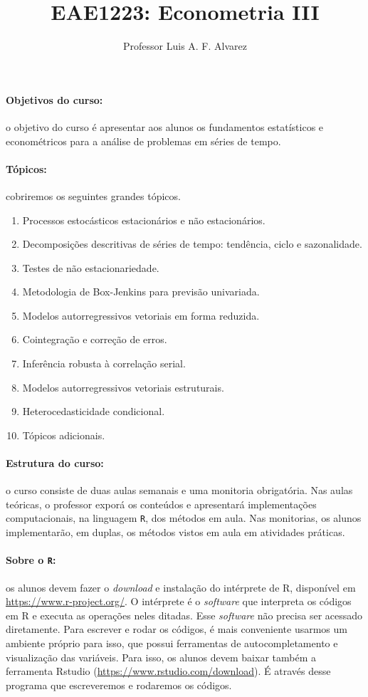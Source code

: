 \documentclass[10pt,a4paper]{article}
\title{\large EAE1223: Econometria III}
\author{Professor Luis A. F. Alvarez}
\date{}
\begin{document}
	\maketitle
	\paragraph{Objetivos do curso:} o objetivo do curso é apresentar aos alunos os fundamentos estatísticos e econométricos para a análise de problemas em séries de tempo.
	\paragraph{Tópicos:} cobriremos os seguintes grandes tópicos.
	\begin{enumerate}
		\item Processos estocásticos estacionários e não estacionários.
		\item Decomposições descritivas de séries de tempo: tendência, ciclo e sazonalidade.
		\item Testes de não estacionariedade.
		\item Metodologia de Box-Jenkins para previsão univariada.
		\item Modelos autorregressivos vetoriais em forma reduzida.
		\item Cointegração e correção de erros.
		\item Inferência robusta à correlação serial.
		\item Modelos autorregressivos vetoriais estruturais.
		\item Heterocedasticidade condicional.
		\item Tópicos adicionais.
	\end{enumerate} 
	\paragraph{Estrutura do curso:} o curso consiste de duas aulas semanais e uma monitoria obrigatória. Nas aulas teóricas, o professor exporá os conteúdos e apresentará implementações computacionais, na linguagem \texttt{R}, dos métodos em aula. Nas monitorias, os alunos implementarão, em duplas, os métodos vistos em aula em atividades práticas.
	
	\paragraph{Sobre o \texttt{R}:}  os alunos devem fazer o \textit{download} e instalação do intérprete de R, disponível em \url{https://www.r-project.org/}. O intérprete é o \textit{software} que interpreta os códigos em R e executa as operações neles ditadas. Esse
	\textit{software} não precisa ser acessado diretamente. Para escrever e rodar os códigos, é mais conveniente usarmos um ambiente próprio para isso, que
	possui ferramentas de autocompletamento e visualização das variáveis. Para isso, os alunos devem baixar também a ferramenta Rstudio (\url{https://www.rstudio.com/download}). É através desse programa que escreveremos e rodaremos os códigos.
\end{document}
